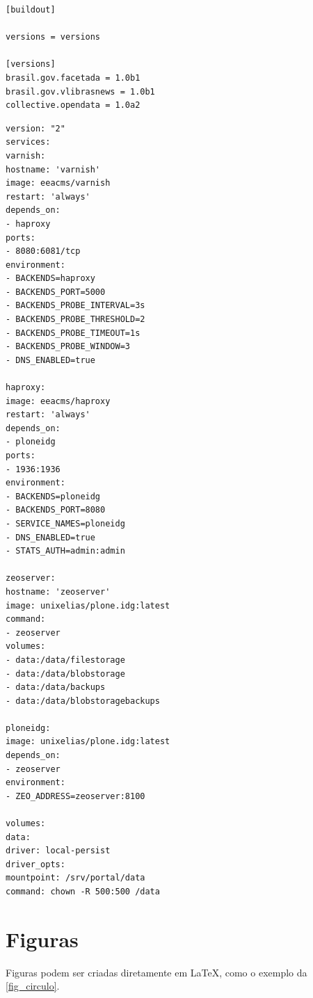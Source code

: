 \clearpage

\begin{lstlisting}[caption={\textit{versions.cfg} criado para pinar as versões dos pacotes adicionais a serem instalados no \textit{Plone} com a IDG},label={cod:versions-mod}]
[buildout]

versions = versions

[versions]
brasil.gov.facetada = 1.0b1
brasil.gov.vlibrasnews = 1.0b1
collective.opendata = 1.0a2
\end{lstlisting}


\begin{lstlisting}[caption={\textit{docker-compose.yml} modificado para adaptar a pilha de serviços \textit{Plone} para o ambiente de produção do Portal da UFVJM},label={cod:docker-compose-mod}]
version: "2"
services:
varnish:
hostname: 'varnish'
image: eeacms/varnish
restart: 'always'
depends_on:
- haproxy
ports:
- 8080:6081/tcp
environment:
- BACKENDS=haproxy
- BACKENDS_PORT=5000
- BACKENDS_PROBE_INTERVAL=3s
- BACKENDS_PROBE_THRESHOLD=2
- BACKENDS_PROBE_TIMEOUT=1s
- BACKENDS_PROBE_WINDOW=3
- DNS_ENABLED=true

haproxy:
image: eeacms/haproxy
restart: 'always'
depends_on:
- ploneidg
ports:
- 1936:1936
environment:
- BACKENDS=ploneidg
- BACKENDS_PORT=8080
- SERVICE_NAMES=ploneidg
- DNS_ENABLED=true
- STATS_AUTH=admin:admin

zeoserver:
hostname: 'zeoserver'
image: unixelias/plone.idg:latest
command:
- zeoserver
volumes:
- data:/data/filestorage
- data:/data/blobstorage
- data:/data/backups
- data:/data/blobstoragebackups

ploneidg:
image: unixelias/plone.idg:latest
depends_on:
- zeoserver
environment:
- ZEO_ADDRESS=zeoserver:8100

volumes:
data:
driver: local-persist
driver_opts:
mountpoint: /srv/portal/data
command: chown -R 500:500 /data
\end{lstlisting}

\section{Figuras}

Figuras podem ser criadas diretamente em \LaTeX,
como o exemplo da \autoref{fig_circulo}.

